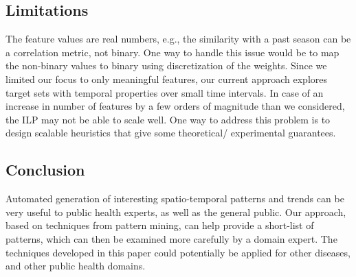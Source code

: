 \subsection*{Limitations}

The feature values are real numbers, e.g., the similarity with a past season can be a correlation metric, not binary. One way to handle this issue would be to map the non-binary values to binary using discretization of the weights. Since we limited our focus to only meaningful features, our current approach explores target sets with temporal properties over small time intervals. In case of an increase in number of features by a few orders of magnitude than we considered, the ILP may not be able to scale well. One way to address this problem is to design scalable heuristics that give some theoretical/ experimental guarantees.




\subsection*{Conclusion}
Automated generation of interesting spatio-temporal patterns and trends can be
very useful to public health experts, as well as the general public.
Our approach, based on techniques from pattern mining, can help provide a short-list
of patterns, which can then be examined more carefully by a domain expert.
The techniques developed in this paper could potentially be applied for other diseases,
and other public health domains. 

